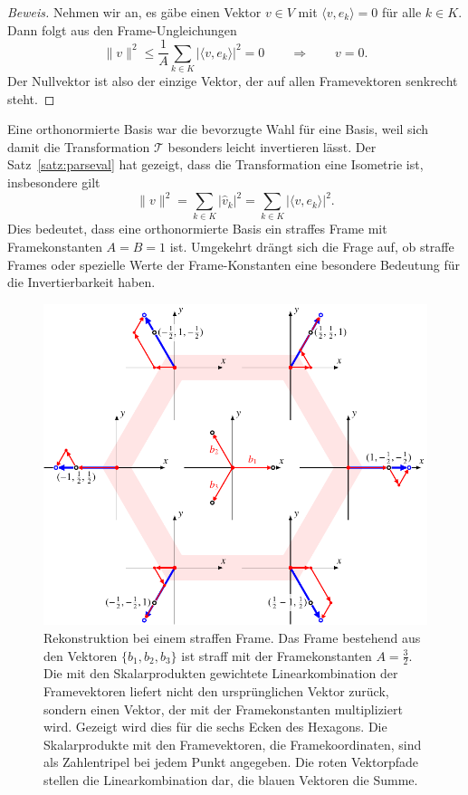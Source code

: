 \begin{proof}[Beweis]
Nehmen wir an, es gäbe einen Vektor $v\in V$ mit $\langle v,e_k\rangle=0$
für alle $k\in K$.
Dann folgt aus den Frame-Ungleichungen
\[
\| v \|^2 \le \frac1{A} \sum_{k\in K} |\langle v,e_k\rangle|^2 = 0
\qquad\Rightarrow\qquad
v=0.
\]
Der Nullvektor ist also der einzige Vektor, der auf allen Framevektoren
senkrecht steht.
\end{proof}

Eine orthonormierte Basis war die bevorzugte Wahl für eine Basis, weil
sich damit die Transformation $\mathcal{T}$ besonders leicht invertieren
lässt.
Der Satz~\ref{satz:parseval} hat gezeigt, dass die Transformation %
eine Isometrie ist, insbesondere gilt
\[
\|v\|^2
=
\sum_{k\in K} |\hat{v}_k|^2
=
\sum_{k\in K} |\langle v,e_k\rangle|^2.
\]
Dies bedeutet, dass eine orthonormierte Basis ein straffes Frame mit
Framekonstanten $A=B=1$ ist.
Umgekehrt drängt sich die Frage auf, ob straffe Frames oder spezielle
Werte der Frame-Konstanten eine besondere Bedeutung für die Invertierbarkeit
haben.

\begin{figure}
\centering
\includegraphics{chapters/1-geometrie/images/hexagon3.pdf}
\caption{Rekonstruktion bei einem straffen Frame.
Das Frame bestehend aus den Vektoren $\{b_1,b_2,b_3\}$ ist straff
mit der Framekonstanten $A=\frac32$.
Die mit den Skalarprodukten gewichtete Linearkombination der
Framevektoren liefert nicht den ursprünglichen Vektor zurück, sondern
einen Vektor, der mit der Framekonstanten multipliziert wird.
Gezeigt wird dies für die sechs Ecken des Hexagons.
Die Skalarprodukte mit den Framevektoren, die Framekoordinaten, sind
als Zahlentripel bei jedem Punkt angegeben.
Die roten Vektorpfade stellen die Linearkombination dar, die blauen
Vektoren die Summe.
\label{geometrie:hexagon:rekonstruktion}}
\end{figure}

